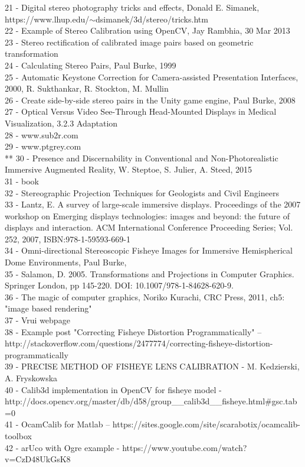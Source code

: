 21 - Digital stereo photography tricks and effects, Donald E. Simanek, \\ https://www.lhup.edu/$\sim$dsimanek/3d/stereo/tricks.htm \\
22 - Example of Stereo Calibration using OpenCV, Jay Rambhia, 30 Mar 2013 \\
23 - Stereo rectification of calibrated image pairs based on geometric transformation \\
24 - Calculating Stereo Pairs, Paul Burke, 1999 \\ 
25 - Automatic Keystone Correction for Camera-assisted Presentation Interfaces, 2000, R. Sukthankar, R. Stockton, M. Mullin \\
26 - Create side-by-side stereo pairs in the Unity game engine, Paul Burke, 2008 \\
27 - Optical Versus Video See-Through Head-Mounted Displays in Medical Visualization, 3.2.3 Adaptation \\
28 - www.sub2r.com \\
29 - www.ptgrey.com \\
** 30 - Presence and Discernability in Conventional and Non-Photorealistic Immersive Augmented Reality, W. Steptoe, S. Julier, A. Steed, 2015 \\
31 - book \\
32 - Stereographic Projection Techniques for Geologists and Civil Engineers \\
33 - Lantz, E. A survey of large-scale immersive displays. Proceedings of the 2007 workshop on Emerging displays technologies: images and beyond: the future of displays and interaction. ACM International Conference Proceeding Series; Vol. 252, 2007, ISBN:978-1-59593-669-1 \\
34 - Omni-directional Stereoscopic Fisheye Images for Immersive Hemispherical Dome Environments, Paul Burke,  \\
35 - Salamon, D. 2005. Transformations and Projections in Computer Graphics. Springer London, pp 145-220. DOI: 10.1007/978-1-84628-620-9. \\
36 - The magic of computer graphics, Noriko Kurachi, CRC Press, 2011, ch5: "image based rendering" \\
37 - Vrui webpage \\
38 - Example post "Correcting Fisheye Distortion Programmatically" -- \\ http://stackoverflow.com/questions/2477774/correcting-fisheye-distortion-programmatically \\
39 - PRECISE METHOD OF FISHEYE LENS CALIBRATION - M. Kedzierski, A. Fryskowska \\
40 - Calib3d implementation in OpenCV for fisheye model - \\ http://docs.opencv.org/master/db/d58/group\_\_calib3d\_\_fisheye.html\#gsc.tab=0 \\
41 - OcamCalib for Matlab -- https://sites.google.com/site/scarabotix/ocamcalib-toolbox \\
42 - arUco with Ogre example - https://www.youtube.com/watch?v=CzD48UkGsK8